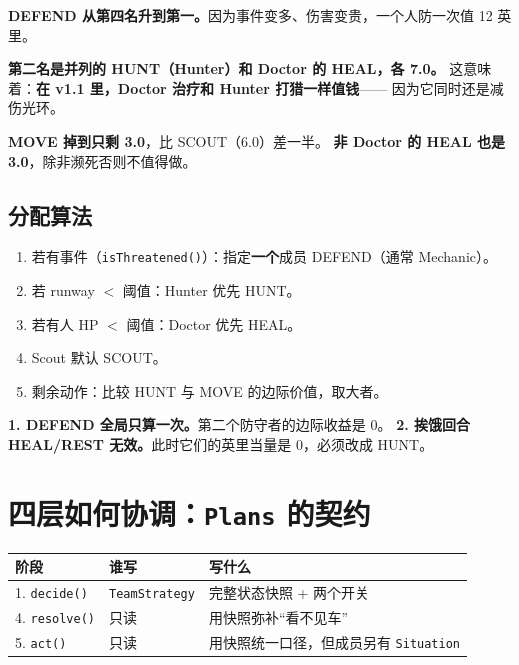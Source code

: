 \documentclass[UTF8,11pt,a4paper]{ctexart}
\begin{document}
\begin{keybox}[title={v1.1 的动作排序变了吗}]
\textbf{DEFEND 从第四名升到第一。}因为事件变多、伤害变贵，一个人防一次值 12 英里。

\textbf{第二名是并列的 HUNT（Hunter）和 Doctor 的 HEAL，各 7.0。}
这意味着：\textbf{在 v1.1 里，Doctor 治疗和 Hunter 打猎一样值钱}——
因为它同时还是减伤光环。

\textbf{MOVE 掉到只剩 3.0}，比 SCOUT（6.0）差一半。
\textbf{非 Doctor 的 HEAL 也是 3.0}，除非濒死否则不值得做。
\end{keybox}

\subsection{分配算法}

\begin{enumerate}[leftmargin=1.8em]
  \item 若有事件（\texttt{isThreatened()}）：指定\textbf{一个}成员 DEFEND（通常 Mechanic）。
  \item 若 runway $<$ 阈值：Hunter 优先 HUNT。
  \item 若有人 HP $<$ 阈值：Doctor 优先 HEAL。
  \item Scout 默认 SCOUT。
  \item 剩余动作：比较 HUNT 与 MOVE 的边际价值，取大者。
\end{enumerate}

\begin{warnbox}[title={两个必须写死的约束}]
\textbf{1. DEFEND 全局只算一次。}第二个防守者的边际收益是 0。
\textbf{2. 挨饿回合 HEAL/REST 无效。}此时它们的英里当量是 0，必须改成 HUNT。
\end{warnbox}

\section{四层如何协调：\texttt{Plans} 的契约}

\begin{center}
\small
\begin{tabular}{@{}p{3.2cm}p{4.6cm}p{6.8cm}@{}}
\toprule
\textbf{阶段} & \textbf{谁写} & \textbf{写什么} \\
\midrule
1. \texttt{decide()} & \texttt{TeamStrategy} & 完整状态快照 + 两个开关 \\
4. \texttt{resolve()} & 只读 & 用快照弥补“看不见车” \\
5. \texttt{act()} & 只读 & 用快照统一口径，但成员另有 \texttt{Situation} \\
\bottomrule
\end{tabular}
\end{center}
\end{document}
